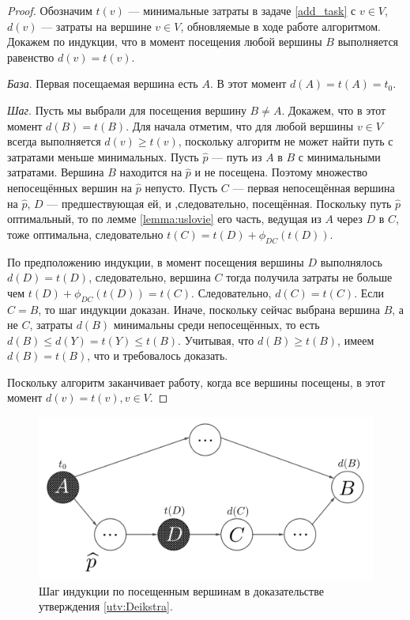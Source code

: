 \documentclass[12pt, a4paper]{article}
\begin{document}
	\begin{proof}
		Обозначим $t(v)$ --- минимальные затраты в задаче \eqref{add_task} с $v \in V$, $d(v)$ --- затраты на вершине $v \in V$, обновляемые в ходе работе алгоритмом. Докажем по индукции, что в момент посещения любой вершины $B$ выполняется равенство  $d(v) = t(v)$.
		
		\textit{База}. Первая посещаемая вершина есть $A$. В этот момент $d(A) = t(A) = t_0$.
		
		\textit{Шаг}. Пусть мы выбрали для посещения вершину $B \ne A$. Докажем, что в этот момент $d(B) = t(B)$. Для начала отметим, что для любой вершины $v \in V$ всегда выполняется $d(v)\ge t(v)$, поскольку алгоритм не может найти путь с затратами меньше минимальных. Пусть $\widehat{p}$ — путь из $A$ в $B$ с минимальными затратами.
		Вершина $B$ находится на $\widehat{p}$ и не посещена. Поэтому множество непосещённых вершин на $\widehat{p}$ непусто. Пусть $C$ --- первая непосещённая вершина на $\widehat{p}$, $D$ --- предшествующая ей, и ,следовательно, посещённая. Поскольку путь $\widehat{p}$ оптимальный, то по лемме \ref{lemma:uslovie} его часть, ведущая из $A$ через $D$ в $C$, тоже оптимальна, следовательно $t(C) = t(D) + \phi_{DC}(t(D))$.

		По предположению индукции, в момент посещения вершины $D$ выполнялось $d(D) = t(D)$, следовательно, вершина $C$ тогда получила затраты не больше чем $t(D) + \phi_{DC}(t(D)) = t(C)$. Следовательно, $d(C) = t(C)$. Если $C = B$, то шаг индукции доказан. Иначе, поскольку сейчас выбрана вершина $B$, а не $C$, затраты $d(B)$ минимальны среди непосещённых, то есть $d(B) \le d(Y) = t(Y) \le t(B)$. Учитывая, что $d(B) \ge t(B)$, имеем $d(B) = t(B)$, что и требовалось доказать.
		
		Поскольку алгоритм заканчивает работу, когда все вершины посещены, в этот момент $d(v) = t(v), v \in V$.
	\end{proof}
	\begin{figure}[H]
	\centering
	\includegraphics[scale=0.25]{Deikstra.png}
	\caption{Шаг индукции по посещенным вершинам в доказательстве утверждения \ref{utv:Deikstra}.}
	\label{ris:Deikstra-graph}
	\end{figure}
\end{document}
